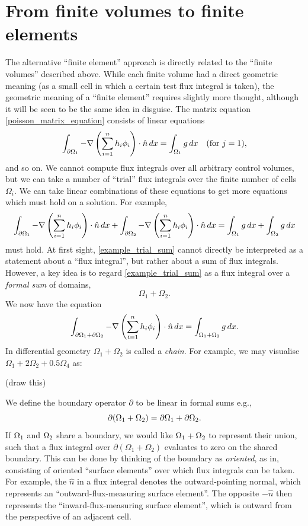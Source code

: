 \section{From finite volumes to finite elements}\label{trial_function}
The alternative ``finite element'' approach is directly related to the ``finite volumes'' described above. While each finite volume
had a direct geometric meaning (as a small cell in which a certain test flux integral is taken), the geometric meaning of a ``finite element''
requires slightly more thought, although it will be seen to be the same idea in disguise.
The matrix equation \eqref{poisson_matrix_equation} consists of linear equations
\begin{align*}
    \int_{{\partial\Omega}_1} -\nabla \left(\sum_{i=1}^n h_i\phi_i\right) \cdot \hat{n}\,dx
    =
    \int_{{\Omega}_1}g\,dx\quad\text{(for $j=1$)},
\end{align*}
and so on. We cannot compute flux integrals
over all arbitrary control volumes, but we can take a number of ``trial'' flux integrals over the finite number of cells $\Omega_i$.
We can take linear combinations of these equations to get more equations which must hold on a solution.
For example,
\begin{equation}\label{example_trial_sum}
    \int_{{\partial\Omega}_1} -\nabla \left(\sum_{i=1}^n h_i\phi_i\right) \cdot \hat{n}\,dx
    +
    \int_{{\partial\Omega}_2} -\nabla \left(\sum_{i=1}^n h_i\phi_i\right) \cdot \hat{n}\,dx
    =
    \int_{{\Omega}_1}g\,dx
    +
    \int_{{\Omega}_2}g\,dx
\end{equation}
must hold. At first sight, \eqref{example_trial_sum} cannot directly be interpreted as a statement about a ``flux integral'', but rather about a sum
of flux integrals. However, a key idea is to regard \eqref{example_trial_sum} as a flux integral over a \textit{formal sum} of domains,
    $$\Omega_1 + \Omega_2.$$
We now have the equation
\begin{equation}
    \int_{{\partial\Omega}_1 + {\partial\Omega}_2} -\nabla \left(\sum_{i=1}^n h_i\phi_i\right) \cdot \hat{n}\,dx
    =
    \int_{{\Omega}_1 + {\Omega}_2}g\,dx.
\end{equation}
In differential geometry $\Omega_1 + \Omega_2$ is called a \textit{chain}. For example, we may visualise $\Omega_1 + 2\Omega_2 + 0.5\Omega_4$ as:

\vskip 0.2in
(draw this)
\vskip 0.2in

We define the boundary operator $\partial$ to be linear in formal sums e.g.,
    $$\partial(\Omega_1 + \Omega_2) = {\partial\Omega}_1 + {\partial\Omega}_2.$$
If ${\Omega}_1$ and ${\Omega}_2$ share a boundary, we would like ${\Omega}_1 + {\Omega}_2$ to represent their union, such that a flux
integral over $\partial(\Omega_1 + \Omega_2)$ evaluates to zero on the shared boundary. This can be done by thinking of
the boundary as \textit{oriented}, as in, consisting of oriented ``surface elements'' over which flux integrals can be taken.
For example, the $\hat{n}$ in a flux integral denotes the outward-pointing normal, which represents an ``outward-flux-measuring surface element''.
The opposite $-\hat{n}$ then represents the ``inward-flux-measuring surface element'', which is outward from the perspective of an adjacent cell.

